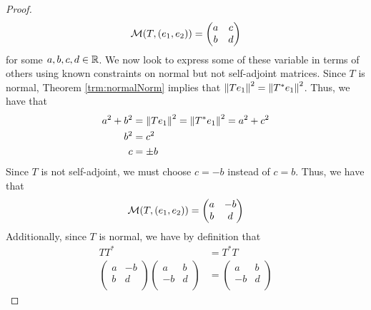 \documentclass[../main.tex]{subfiles}
\begin{document}
\begin{itemize}
\begin{theorem}
\begin{proof}
\begin{equation*}
                \mathcal{M}(T,(e_1,e_2)) =
                \begin{pmatrix}
                    a & c\\
                    b & d\\
                \end{pmatrix}
            \end{equation*}
            for some $a,b,c,d\in\mathbb{R}$. We now look to express some of these variable in terms of others using known constraints on normal but not self-adjoint matrices. Since $T$ is normal, Theorem \ref{trm:normalNorm} implies that $\norm{Te_1}^2=\norm{T^*e_1}^2$. Thus, we have that
            \begin{align*}
                a^2+b^2 &= \norm{Te_1}^2 = \norm{T^*e_1}^2 = a^2+c^2\\
                b^2 &= c^2\\
                c &= \pm b
            \end{align*}
            Since $T$ is not self-adjoint, we must choose $c=-b$ instead of $c=b$. Thus, we have that
            \begin{equation*}
                \mathcal{M}(T,(e_1,e_2)) =
                \begin{pmatrix}
                    a & -b\\
                    b & d\\
                \end{pmatrix}
            \end{equation*}
            Additionally, since $T$ is normal, we have by definition that
            \begin{align*}
                TT^* &= T^*T\\
                \begin{pmatrix}
                    a & -b\\
                    b & d\\
                \end{pmatrix}
                \begin{pmatrix}
                    a & b\\
                    -b & d\\
                \end{pmatrix}
                &=
                \begin{pmatrix}
                    a & b\\
                    -b & d\\
                \end{pmatrix}

\end{align*}
\end{proof}
\end{theorem}
\end{itemize}
\end{document}
